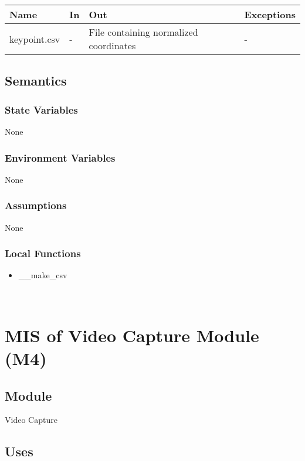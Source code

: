 \documentclass[12pt, titlepage]{article}
\begin{document}
\begin{center}
\begin{tabular}{p{5cm} p{4cm} p{4cm} p{2cm}}
\hline
\textbf{Name} & \textbf{In} & \textbf{Out} & \textbf{Exceptions} \\
\hline
keypoint.csv & - & File containing normalized coordinates & - \\
\hline
\end{tabular}
\end{center}

\subsection{Semantics}

\subsubsection{State Variables}

None

\subsubsection{Environment Variables}

None

\subsubsection{Assumptions}

None

\subsubsection{Local Functions}
\begin{itemize}
\item \_\_make\_csv
\end{itemize}

~\newpage

\section{MIS of Video Capture Module (M4)} \label{m4}

\subsection{Module}

Video Capture

\subsection{Uses}
\end{document}
